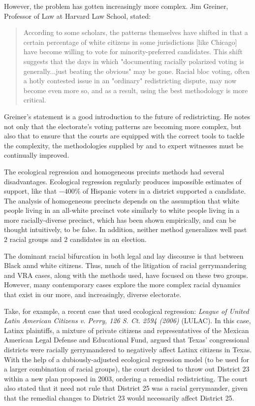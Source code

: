 However, the problem has gotten increasingly more complex. Jim Greiner, Professor of Law at Harvard Law School, stated:

\begin{quote}
 According to some scholars, the patterns themselves have shifted in that a certain percentage of white citizens in some jurisdictions [like Chicago] have become willing to vote for minority-preferred candidates. This shift suggests that the days in which "documenting racially polarized voting is generally...just beating the obvious" may be gone. Racial bloc voting, often a hotly contested issue in an "ordinary" redistricting dispute, may now become even more so, and as a result, using the best methodology is more critical.\cite{greiner}
\end{quote}

Greiner's statement is a good introduction to the future of redistricting. He notes not only that the electorate's voting patterns are becoming more complex, but also that to ensure that the courts are equipped with the correct tools to tackle the complexity, the methodologies supplied by and to expert witnesses must be continually improved.

The ecological regression and homogeneous precints methods had several disadvantages. Ecological regression regularly produces impossible estimates of support, like that $-400\%$ of Hispanic voters in a district supported a candidate. The analysis of homogeneous precincts depends on the assumption that white people living in an all-white precinct vote similarly to white people living in a more racially-diverse precinct, which has been shown empirically, and can be thought intuitively, to be false.\cite{greiner} In addition, neither method generalizes well past $2$ racial groups and $2$ candidates in an election.

The dominant racial bifurcation in both legal and lay discourse is that between Black annd white citizens. Thus, much of the litigation of racial gerrymandering and VRA cases, along with the methods used, have focused on these two groups. However, many contemporary cases explore the more complex racial dynamics that exist in our more, and increasingly, diverse electorate.

Take, for example, a recent case that used ecological regression: \textit{League of United Latin American Citizens v. Perry, 126 S. Ct. 2594 (2006)} (LULAC). In this case, Latinx plaintiffs, a mixture of private citizens and representatives of the Mexican American Legal Defense and Educational Fund, argued that Texas' congressional districts were racially gerrymandered to negatively affect Latinx citizens in Texas. With the help of a dubiously-adjusted ecological regression model (to be used for a larger combination of racial groups), the court decided to throw out District 23 within a new plan proposed in 2003, ordering a remedial redistricting.\cite{LULAC} The court also stated that it need not rule that District 25 was a racial gerrymander, given that the remedial changes to District 23 would necessarily affect District 25.

